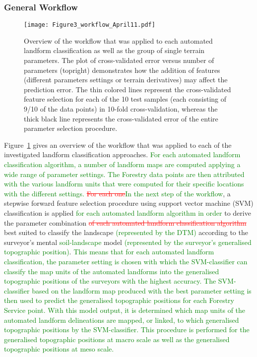 \documentclass[preprint,12pt,authoryear]{elsarticle}
\begin{document}
\subsubsection{General Workflow}
\begin{figure}
\texttt{[image: Figure3\_workflow\_April11.pdf]}
\caption{Overview of the workflow that was applied to each automated landform classification as well as the group of single terrain parameters. The plot of cross-validated error versus number of parameters (topright) demonstrates how the addition of features (different parameters settings or terrain derivatives) may affect the prediction error. The thin colored lines represent the cross-validated feature selection for each of the 10 test samples (each consisting of 9/10 of the data points) in 10-fold cross-validation, whereas the thick black line represents the cross-validated error of the entire parameter selection procedure.}
\label{fig:workflow}
\end{figure}
Figure~\ref{fig:workflow} gives an overview of the workflow that was applied to each of the investigated landform classification approaches. \textcolor{green}{For each automated landform classification algorithm, a number of landform maps are computed applying a wide range of parameter settings. The Forestry data points are then attributed with the various landform units that were computed for their  specific locations with the different settings.} \textcolor{red}{\sout{For each one}}\textcolor{green}{In the next step of the workflow}, a stepwise forward feature selection procedure using support vector machine (SVM) classification \textcolor{green}{\cite{Cortes1995}} is applied \textcolor{green}{for each automated landform algorithm in order }to derive the parameter combination \textcolor{red}{\sout{of each automated landform classification algorithm }}best suited to classify the landscape \textcolor{green}{(represented by the DTM)} according to the surveyor's mental \textcolor{green}{soil-landscape} model \textcolor{green}{(represented by the surveyor's generalised topographic position)}. \textcolor{green}{This means that for each automated landform classification, the parameter setting is chosen with which the SVM-classifier can classify the map units of the automated landforms into the generalised topographic positions of the surveyors with the highest accuracy.  The SVM-classifier based on the landform map  produced with the best parameter setting is then used to predict the generalised topographic positions for each Forestry Service point. With this model output, it is determined which map units of the automated landform delineations are mapped, or linked, to which generalised topographic positions by the SVM-classifier. This procedure is performed for the generalised topographic positions at macro scale as well as the generalised topographic positions at meso scale.}
\end{document}
